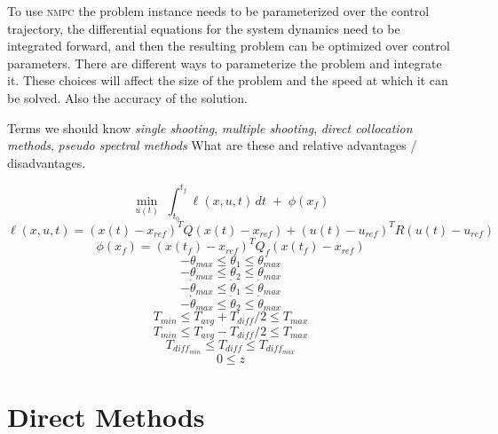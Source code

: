 \documentclass[]{article}
\newcommand{\nmpc}{\textsc{nmpc}}
\begin{document}
To use {\nmpc} the problem instance needs to be parameterized over the control trajectory, the differential equations for the system dynamics need to be integrated forward, and then the resulting problem can be optimized over control parameters. There are different ways to parameterize the problem and integrate it.  These choices will affect the size of the problem and the speed at which it can be solved. Also the accuracy of the solution.

Terms we should know {\em single shooting}, {\em multiple shooting}, {\em direct collocation methods}, {\em pseudo spectral methods} What are these and relative advantages / disadvantages.


        \[
        \min_{u(t)} \; \int_{t_0}^{t_f} \ell(x,u,t)\,dt \;+\; \phi(x_f)
        \]
        \[
	\ell(x,u,t) = (x(t)-x_{ref})^T Q (x(t)-x_{ref}) + (u(t)-u_{ref})^T R (u(t)-u_{ref}) 
        \]
        \[
	\phi(x_f) = (x(t_f)-x_{ref})^T Q_f (x(t_f)-x_{ref})
        \]
        \[
	-\theta_{max} \leq \theta_1 \leq \theta_{max}
        \]
        \[
	-\theta_{max} \leq \theta_2 \leq \theta_{max}
        \]
        \[
        	-\dot{\theta}_{max} \leq \dot{\theta}_1 \leq \dot{\theta}_{max}
        \]
        \[
        	-\dot{\theta}_{max} \leq \dot{\theta}_2 \leq \dot{\theta}_{max}
        \]
        \[
        	T_{min}  \leq T_{avg} + T_{diff}/2 \leq T_{max}
        \]
        \[
        T_{min} \leq  T_{avg} - T_{diff}/2 \leq T_{max}
        \]
        \[
        T_{diff_{min}} \leq T_{diff} \leq T_{diff_{max}}
        \]
        \[
        0 \leq z
        \]
        
\section{Direct Methods}
\end{document}
